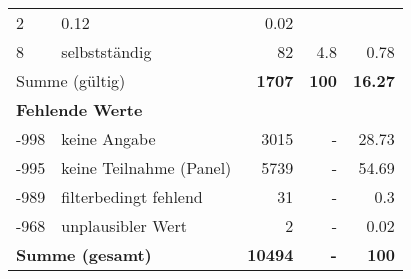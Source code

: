 \begin{longtable}{lXrrr}
       \num{2} &
       \num[round-mode=places,round-precision=2]{0.12} &
         \num[round-mode=places,round-precision=2]{0.02} \\

     8 &
     \multicolumn{1}{X}{ selbstständig   } &


       \num{82} &
       \num[round-mode=places,round-precision=2]{4.8} &
         \num[round-mode=places,round-precision=2]{0.78} \\
     \midrule
     \multicolumn{2}{l}{Summe (gültig)} &
       \textbf{\num{1707}} &
     \textbf{\num{100}} &
       \textbf{\num[round-mode=places,round-precision=2]{16.27}} \\
     \multicolumn{5}{l}{\textbf{Fehlende Werte}}\\
       -998 &
       keine Angabe &
         \num{3015} &
        - &
         \num[round-mode=places,round-precision=2]{28.73} \\
       -995 &
       keine Teilnahme (Panel) &
         \num{5739} &
        - &
         \num[round-mode=places,round-precision=2]{54.69} \\
       -989 &
       filterbedingt fehlend &
         \num{31} &
        - &
         \num[round-mode=places,round-precision=2]{0.3} \\
       -968 &
       unplausibler Wert &
         \num{2} &
        - &
         \num[round-mode=places,round-precision=2]{0.02} \\
     \midrule
     \multicolumn{2}{l}{\textbf{Summe (gesamt)}} &
          \textbf{\num{10494}} &
        \textbf{-} &
        \textbf{\num{100}} \\
     \bottomrule
     \end{longtable}
     
